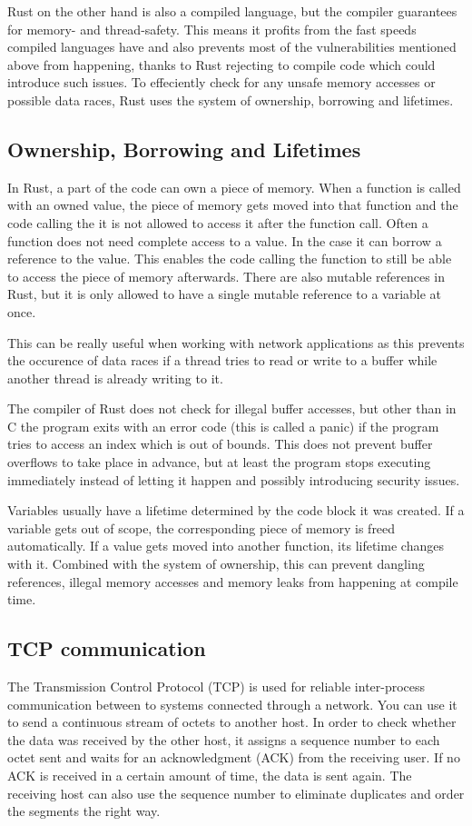 Rust on the other hand is also a compiled language, but the compiler guarantees for memory- and thread-safety. This
means it profits from the fast speeds compiled languages have and also prevents most of the vulnerabilities mentioned
above from happening, thanks to Rust rejecting to compile code which could introduce such issues. To effeciently check
for any unsafe memory accesses or possible data races, Rust uses the system of ownership, borrowing and lifetimes.

\subsection{Ownership, Borrowing and Lifetimes}
In Rust, a part of the code can own a piece of memory. When a function is called with an owned value, the piece of
memory gets moved into that function and the code calling the it is not allowed to access it after the function call.
Often a function does not need complete access to a value. In the case it can borrow a reference to the value. This
enables the code calling the function to still be able to access the piece of memory afterwards. There are also mutable
references in Rust, but it is only allowed to have a single mutable reference to a variable at once.

This can be really useful when working with network applications as this prevents the occurence of data races if a
thread tries to read or write to a buffer while another thread is already writing to it.

The compiler of Rust does not check for illegal buffer accesses, but other than in C the program exits with an error
code (this is called a panic) if the program tries to access an index which is out of bounds. This does not prevent
buffer overflows to take place in advance, but at least the program stops executing immediately instead of letting it
happen and possibly introducing security issues.

Variables usually have a lifetime determined by the code block it was created. If a variable gets out of scope, the
corresponding piece of memory is freed automatically. If a value gets moved into another function, its lifetime changes
with it. Combined with the system of ownership, this can prevent dangling references, illegal memory accesses and
memory leaks from happening at compile time. \cite{c15safe}

\subsection{TCP communication}
The Transmission Control Protocol (TCP) is used for reliable inter-process communication between to systems connected
through a network. You can use it to send a continuous stream of octets to another host. In order to check whether the
data was received by the other host, it assigns a sequence number to each octet sent and waits for an acknowledgment
(ACK) from the receiving user. If no ACK is received in a certain amount of time, the data is sent again. The receiving
host can also use the sequence number to eliminate duplicates and order the segments the right way. \cite{rfc793}

